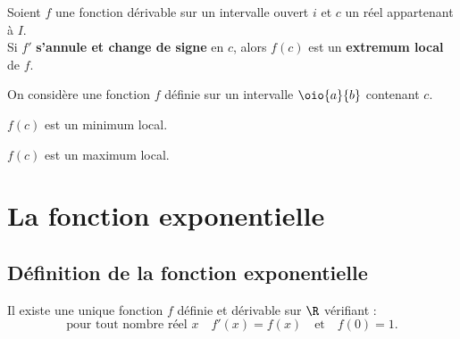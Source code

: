 \documentclass[a4paper,11pt,cours]{nsi} %
\begin{document}
\begin{propriete}[]
	Soient $f$ une fonction dérivable sur un intervalle ouvert $i$ et $c$ un réel appartenant à $I$.\\
	Si $f'$ \textbf{s'annule et change de signe} en $c$, alors $f(c)$ est un \textbf{extremum local} de $f$.
\end{propriete}



\begin{exemple}[s]
	On considère une fonction $f$ définie sur un intervalle $\oio{a}{b}$ contenant $c$.
	\begin{multicols}{2}
		\begin{center}
			\end{center}
			$f(c)$ est un minimum local.\\
		\begin{center}
			\end{center}
			$f(c)$ est un maximum local.\\	
	\end{multicols}
\end{exemple}

\section{La fonction exponentielle}

\subsection*{Définition de la fonction exponentielle}
\begin{propriete}[]
	Il existe une unique fonction $f$ définie et dérivable sur $\R$ vérifiant : 
	$$\text{pour tout nombre réel }x  \quad f'(x)=f(x)\quad \text{et} \quad f(0)=1.$$
\end{propriete}
\end{document}
